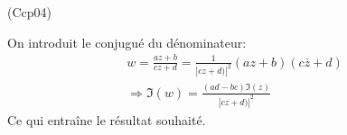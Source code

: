 \begin{tiny}(Ccp04)\end{tiny} \label{Ccp04} On introduit le conjugué du dénominateur:
\begin{multline*}
  w = \frac{az+b}{cz+d} = \frac{1}{\left|cz+d)\right|^2}(az+b)(c\overline{z}+d)\\
  \Rightarrow \Im(w) = \frac{(ad-bc)\Im(z)}{\left|cz+d)\right|^2}
\end{multline*}
Ce qui entraîne le résultat souhaité.